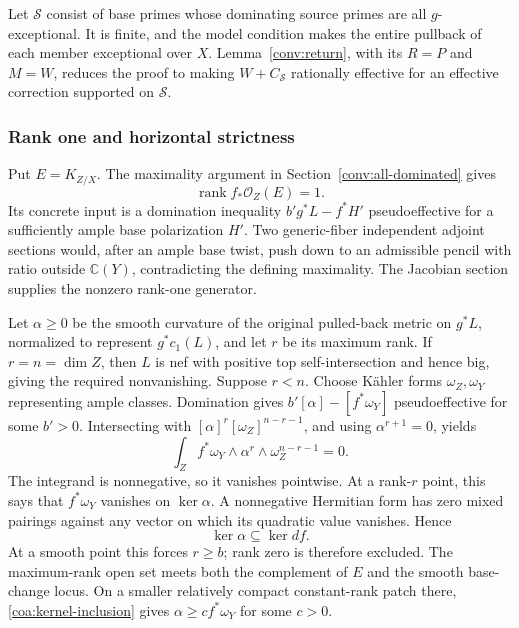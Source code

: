 Let $\mathcal S$ consist of base primes whose dominating source
primes are all $g$-exceptional.  It is finite, and the model condition
makes the entire pullback of each member exceptional over $X$.
Lemma~\ref{conv:return}, with its $R=P$ and $M=W$, reduces the
proof to making $W+C_{\mathcal S}$ rationally effective for an
effective correction supported on $\mathcal S$.

\subsubsection*{Rank one and horizontal strictness}

Put $E=K_{Z/X}$.  The maximality argument in
Section~\ref{conv:all-dominated} gives
\begin{equation}\label{coa:rank-one}
 \operatorname{rank}f_*\mathcal O_Z(E)=1.
\end{equation}
Its concrete input is a domination inequality
$b'g^*L-f^*H'$ pseudoeffective for a sufficiently ample base
polarization $H'$.  Two generic-fiber independent adjoint sections
would, after an ample base twist, push down to an admissible pencil
with ratio outside $\mathbb C(Y)$, contradicting the defining
maximality.  The Jacobian section supplies the nonzero rank-one
generator.

Let $\alpha\ge0$ be the smooth curvature of the original pulled-back
metric on $g^*L$, normalized to represent $g^*c_1(L)$, and let $r$
be its maximum rank.  If $r=n=\dim Z$, then $L$ is nef with positive
top self-intersection and hence big, giving the required nonvanishing.
Suppose $r<n$.  Choose K\"ahler
forms $\omega_Z,\omega_Y$ representing ample classes.
Domination gives $b'[\alpha]-[f^*\omega_Y]$ pseudoeffective for
some $b'>0$.  Intersecting with
$[\alpha]^r[\omega_Z]^{n-r-1}$, and using $\alpha^{r+1}=0$, yields
\[
 \int_Z f^*\omega_Y\wedge\alpha^r\wedge\omega_Z^{n-r-1}=0.
\]
The integrand is nonnegative, so it vanishes pointwise.  At a
rank-$r$ point, this says that $f^*\omega_Y$ vanishes on
$\ker\alpha$.  A nonnegative Hermitian form has zero mixed pairings
against any vector on which its quadratic value vanishes.  Hence
\begin{equation}\label{coa:kernel-inclusion}
 \ker\alpha\subseteq\ker df.
\end{equation}
At a smooth point this forces $r\ge b$; rank zero is therefore
excluded.  The maximum-rank open set meets both the complement of
$E$ and the smooth base-change locus.  On a smaller relatively compact
constant-rank patch there, \eqref{coa:kernel-inclusion} gives
$\alpha\ge c f^*\omega_Y$ for some $c>0$.

